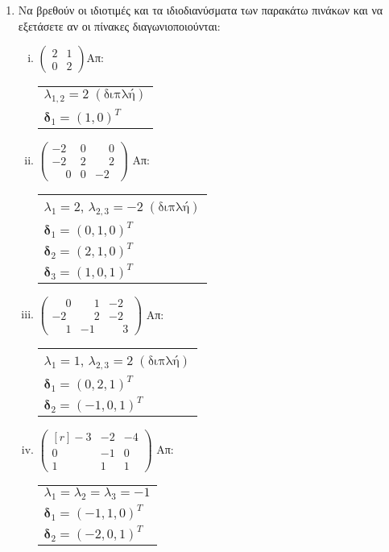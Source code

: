 \begin{enumerate}
\begin{enumerate}[i)]
\end{enumerate}

\item Να βρεθούν οι ιδιοτιμές και τα ιδιοδιανύσματα των παρακάτω πινάκων και να εξετάσετε αν οι πίνακες διαγωνιοποιούνται:

\begin{enumerate}[i)]

\item $\begin{pmatrix}
2 & 1 \\
0 & 2
\end{pmatrix}$\hfill Απ: \begin{tabular}{l}
$\lambda_{1,2}=2 \; (\text{διπλή})$ \\
$\bm{\delta}_1=(1,0)^T$ \\
\end{tabular}

\item $\begin{pmatrix}
-2 & 0 & \phantom{-}0 \\
-2 & 2 & \phantom{-}2 \\
\phantom{-}0 & 0 & -2
\end{pmatrix}$ \hfill Απ: \begin{tabular}{l}
$\lambda_1=2$, $\lambda_{2,3}=-2 \; (\text{διπλή})$ \\ 
$\bm{\delta}_1=(0,1,0)^T$ \\
$\bm{\delta}_2=(2,1,0)^T$ \\
$\bm{\delta}_3=(1,0,1)^T$
\end{tabular}



\item $\begin{pmatrix}
\phantom{-}0 & \phantom{-}1 & -2 \\
-2 & \phantom{-}2 & -2 \\
\phantom{-}1 & -1 & \phantom{-}3
\end{pmatrix}$ \hfill Απ: \begin{tabular}{l}
$\lambda_1=1$, $\lambda_{2,3}=2 \; (\text{διπλή})$ \\ 
$\bm{\delta}_1=(0,2,1)^T$ \\
$\bm{\delta}_2=(-1,0,1)^T$ \\
\end{tabular}

\item $ \begin{pmatrix*}[r]
		-3 & -2 & -4 \\
		0 & -1 & 0 \\
		1 & 1 & 1 
\end{pmatrix*}$ \hfill Απ: \begin{tabular}{l}
$ \lambda_{1} = \lambda_{2} = \lambda_{3} = -1 $ \\
$ \bm{\delta}_{1} = (-1,1,0)^T$ \\
$ \bm{\delta}_{2} = (-2,0,1)^{T} $
\end{tabular}


\end{enumerate}
\end{enumerate}
